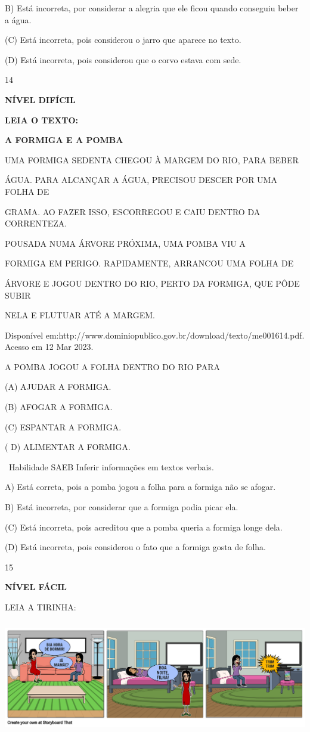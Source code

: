 {{B) Está incorreta, por considerar a alegria que ele ficou quando
conseguiu beber a água.

(C) Está incorreta, pois considerou o jarro que aparece no texto.

(D) Está incorreta, pois considerou que o corvo estava com sede.

\num{14}

\textbf{NÍVEL DIFÍCIL}

\textbf{LEIA O TEXTO:}

\textbf{A FORMIGA E A POMBA}

UMA FORMIGA SEDENTA CHEGOU À MARGEM DO RIO, PARA BEBER

ÁGUA. PARA ALCANÇAR A ÁGUA, PRECISOU DESCER POR UMA FOLHA DE

GRAMA. AO FAZER ISSO, ESCORREGOU E CAIU DENTRO DA CORRENTEZA.

POUSADA NUMA ÁRVORE PRÓXIMA, UMA POMBA VIU A

FORMIGA EM PERIGO. RAPIDAMENTE, ARRANCOU UMA FOLHA DE

ÁRVORE E JOGOU DENTRO DO RIO, PERTO DA FORMIGA, QUE PÔDE SUBIR

NELA E FLUTUAR ATÉ A MARGEM.

Disponível
em:http://www.dominiopublico.gov.br/download/texto/me001614.pdf. Acesso
em 12 Mar 2023.

A POMBA JOGOU A FOLHA DENTRO DO RIO PARA

(A) AJUDAR A FORMIGA.

(B) AFOGAR A FORMIGA.

(C) ESPANTAR A FORMIGA.

( D) ALIMENTAR A FORMIGA.

~Habilidade SAEB Inferir informações em textos verbais.

A) Está correta, pois a pomba jogou a folha para a formiga não se
afogar.

B) Está incorreta, por considerar que a formiga podia picar ela.

(C) Está incorreta, pois acreditou que a pomba queria a formiga longe
dela.

(D) Está incorreta, pois considerou o fato que a formiga gosta de folha.

\num{15}

\textbf{NÍVEL FÁCIL}

LEIA A TIRINHA:

\includegraphics[width=5.90556in,height=1.95694in]{media/image172.png}

}}
